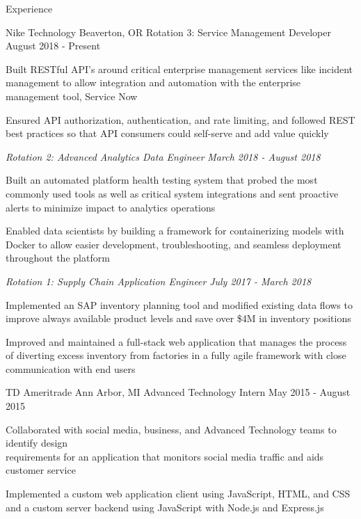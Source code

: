 \documentclass{resume}
\begin{document}
\begin{rSection}{Experience}

\begin{rSubsection}{Nike Technology}
                   {Beaverton, OR}
                   {Rotation 3: Service Management Developer}
                   {August 2018 - Present}
    \item Built RESTful API's around critical enterprise management services like incident management
          to allow integration and automation with the enterprise management tool, Service Now
    \item Ensured API authorization, authentication, and rate limiting, and followed REST best practices
          so that API consumers could self-serve and add value quickly

    \vspace{-1mm}
    {\em Rotation 2: Advanced Analytics Data Engineer} \hfill {\em March 2018 -  August 2018}
    \item Built an automated platform health testing system that probed the most
          commonly used tools as well as critical system integrations and sent
          proactive alerts to minimize impact to analytics operations
    \item Enabled data scientists by building a framework for containerizing models
          with Docker to allow easier development, troubleshooting, and seamless deployment
          throughout the platform

    \vspace{-1mm}
    {\em Rotation 1: Supply Chain Application Engineer} \hfill {\em July 2017 - March 2018}
    \item Implemented an SAP inventory planning tool and modified existing data flows
          to improve always available product levels and save over \$4M in inventory positions
    \item Improved and maintained a full-stack web application that manages the process of
          diverting excess inventory from factories in a fully agile framework with close
          communication with end users
\end{rSubsection}


\begin{rSubsection}{TD Ameritrade}
                   {Ann Arbor, MI}
                   {Advanced Technology Intern}
                   {May 2015 - August 2015}
    \item Collaborated with social media, business, and Advanced Technology
          teams to identify design \\ requirements for an application that
          monitors social media traffic and aids customer service
    \item Implemented a custom web application client using JavaScript, HTML,
          and CSS and a custom server backend using JavaScript with Node.js and
          Express.js
\end{rSubsection}


\end{rSection}
\end{document}
